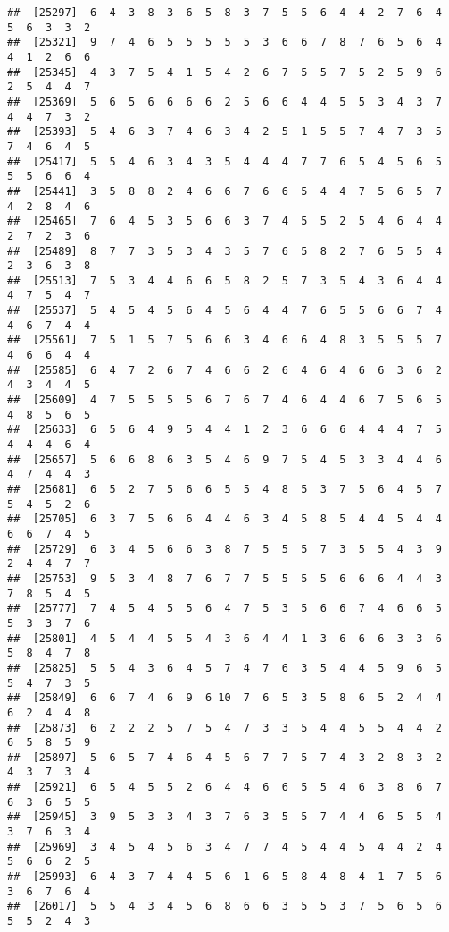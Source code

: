 \documentclass[
]{book}
\begin{document}
\begin{verbatim}
##  [25297]  6  4  3  8  3  6  5  8  3  7  5  5  6  4  4  2  7  6  4  5  6  3  3  2
##  [25321]  9  7  4  6  5  5  5  5  5  3  6  6  7  8  7  6  5  6  4  4  1  2  6  6
##  [25345]  4  3  7  5  4  1  5  4  2  6  7  5  5  7  5  2  5  9  6  2  5  4  4  7
##  [25369]  5  6  5  6  6  6  6  2  5  6  6  4  4  5  5  3  4  3  7  4  4  7  3  2
##  [25393]  5  4  6  3  7  4  6  3  4  2  5  1  5  5  7  4  7  3  5  7  4  6  4  5
##  [25417]  5  5  4  6  3  4  3  5  4  4  4  7  7  6  5  4  5  6  5  5  5  6  6  4
##  [25441]  3  5  8  8  2  4  6  6  7  6  6  5  4  4  7  5  6  5  7  4  2  8  4  6
##  [25465]  7  6  4  5  3  5  6  6  3  7  4  5  5  2  5  4  6  4  4  2  7  2  3  6
##  [25489]  8  7  7  3  5  3  4  3  5  7  6  5  8  2  7  6  5  5  4  2  3  6  3  8
##  [25513]  7  5  3  4  4  6  6  5  8  2  5  7  3  5  4  3  6  4  4  4  7  5  4  7
##  [25537]  5  4  5  4  5  6  4  5  6  4  4  7  6  5  5  6  6  7  4  4  6  7  4  4
##  [25561]  7  5  1  5  7  5  6  6  3  4  6  6  4  8  3  5  5  5  7  4  6  6  4  4
##  [25585]  6  4  7  2  6  7  4  6  6  2  6  4  6  4  6  6  3  6  2  4  3  4  4  5
##  [25609]  4  7  5  5  5  5  6  7  6  7  4  6  4  4  6  7  5  6  5  4  8  5  6  5
##  [25633]  6  5  6  4  9  5  4  4  1  2  3  6  6  6  4  4  4  7  5  4  4  4  6  4
##  [25657]  5  6  6  8  6  3  5  4  6  9  7  5  4  5  3  3  4  4  6  4  7  4  4  3
##  [25681]  6  5  2  7  5  6  6  5  5  4  8  5  3  7  5  6  4  5  7  5  4  5  2  6
##  [25705]  6  3  7  5  6  6  4  4  6  3  4  5  8  5  4  4  5  4  4  6  6  7  4  5
##  [25729]  6  3  4  5  6  6  3  8  7  5  5  5  7  3  5  5  4  3  9  2  4  4  7  7
##  [25753]  9  5  3  4  8  7  6  7  7  5  5  5  5  6  6  6  4  4  3  7  8  5  4  5
##  [25777]  7  4  5  4  5  5  6  4  7  5  3  5  6  6  7  4  6  6  5  5  3  3  7  6
##  [25801]  4  5  4  4  5  5  4  3  6  4  4  1  3  6  6  6  3  3  6  5  8  4  7  8
##  [25825]  5  5  4  3  6  4  5  7  4  7  6  3  5  4  4  5  9  6  5  5  4  7  3  5
##  [25849]  6  6  7  4  6  9  6 10  7  6  5  3  5  8  6  5  2  4  4  6  2  4  4  8
##  [25873]  6  2  2  2  5  7  5  4  7  3  3  5  4  4  5  5  4  4  2  6  5  8  5  9
##  [25897]  5  6  5  7  4  6  4  5  6  7  7  5  7  4  3  2  8  3  2  4  3  7  3  4
##  [25921]  6  5  4  5  5  2  6  4  4  6  6  5  5  4  6  3  8  6  7  6  3  6  5  5
##  [25945]  3  9  5  3  3  4  3  7  6  3  5  5  7  4  4  6  5  5  4  3  7  6  3  4
##  [25969]  3  4  5  4  5  6  3  4  7  7  4  5  4  4  5  4  4  2  4  5  6  6  2  5
##  [25993]  6  4  3  7  4  4  5  6  1  6  5  8  4  8  4  1  7  5  6  3  6  7  6  4
##  [26017]  5  5  4  3  4  5  6  8  6  6  3  5  5  3  7  5  6  5  6  5  5  2  4  3

\end{verbatim}
\end{document}
